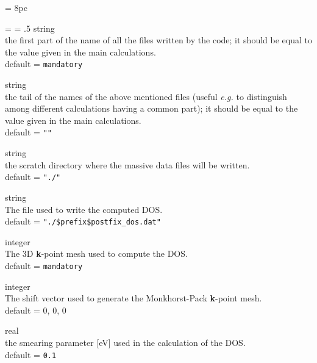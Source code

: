 \newdimen\descindent \descindent = 8pc
{\noindent \leftskip = \descindent \parskip = .5\baselineskip
{}%
{\sc string} \\ the first part of the name of all the files written by the code;
              it should be equal to the value given in the main calculations.\\
{\sc default} = {\tt mandatory} \par

\noindent{}%
{\sc string} \\ the tail of the names of the above mentioned files (useful
    {\it e.g.} to distinguish among different calculations having a common part);
    it should be equal to the value given in the main calculations.\\
    {\sc default} = {\tt ""} \par

\noindent{}%
{\sc string} \\ the scratch directory where the massive data files will be written.\\
              {\sc default} = {\tt "./"} \par

\noindent{}%
{\sc string} \\ The file used to write the computed DOS. \\
              {\sc default} = {\tt "./\$prefix\$postfix\_dos.dat" } \par

\noindent{}%
{\sc integer} \\ The 3D \textbf{k}-point mesh used to compute the DOS. \\
{\sc default} = {\tt mandatory} \par

\noindent{}%
{\sc integer} \\ The shift vector used to generate the Monkhorst-Pack \textbf{k}-point mesh. \\
{\sc default} = 0, 0, 0 \par

\noindent{}%
{\sc real} \\ the smearing parameter [eV] used in the calculation of the DOS. \\
{\sc default} = {\tt 0.1} \par

}
